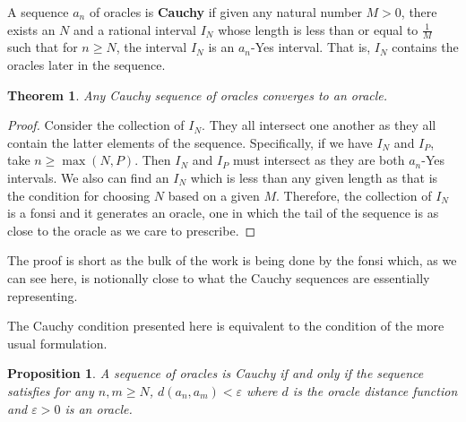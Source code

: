 \documentclass[12pt]{article}
\newtheorem{theorem}{Theorem}[subsection]
\newtheorem{proposition}{Proposition}[subsection]
\begin{document}
A sequence $a_n$ of oracles is \textbf{Cauchy} if given any natural number $M > 0$, there exists an $N$ and a rational interval $I_N$ whose length is less than or equal to $\frac{1}{M}$ such that for $n \geq N$, the interval $I_N$ is an $a_n$-Yes interval. That is, $I_N$ contains the oracles later in the sequence. 

\begin{theorem}\label{th:cauchy}
Any Cauchy sequence of oracles converges to an oracle. 
\end{theorem}

\begin{proof}
    Consider the collection of $I_N$. They all intersect one another as they all contain the latter elements of the sequence. Specifically, if we have $I_N$ and $I_P$, take $n \geq \max(N, P)$. Then $I_N$ and $I_P$ must intersect as they are both $a_n$-Yes intervals. We also can find an $I_N$ which is less than any given length as that is the condition for choosing $N$ based on a given $M$. Therefore, the collection of $I_N$ is a fonsi and it generates an oracle, one in which the tail of the sequence is as close to the oracle as we care to prescribe.     
\end{proof}

The proof is short as the bulk of the work is being done by the fonsi which, as we can see here, is notionally close to what the Cauchy sequences are essentially representing. 

The Cauchy condition presented here is equivalent to the condition of the more usual formulation.

\begin{proposition}
    A sequence of oracles is Cauchy if and only if the sequence satisfies for any $n, m \geq N$, $d(a_n,  a_m) < \varepsilon$ where $d$ is the oracle distance function and $\varepsilon > 0$ is an oracle. 
\end{proposition} 
\end{document}
